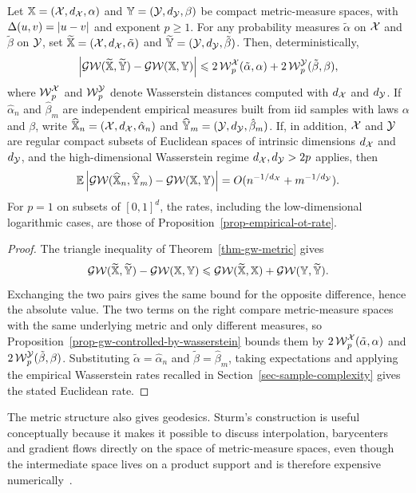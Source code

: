 \begin{prop}\label{prop-gw-empirical-stability}
	Let $\mathbb{X}=(\mathcal{X},d_{\mathcal{X}},\alpha)$ and $\mathbb{Y}=(\mathcal{Y},d_{\mathcal{Y}},\beta)$ be compact metric-measure spaces, with $\Delta(u,v)=|u-v|$ and exponent $p\geq1$. For any probability measures $\tilde\alpha$ on $\mathcal{X}$ and $\tilde\beta$ on $\mathcal{Y}$, set
	$\widetilde{\mathbb{X}}=(\mathcal{X},d_{\mathcal{X}},\tilde\alpha)$ and $\widetilde{\mathbb{Y}}=(\mathcal{Y},d_{\mathcal{Y}},\tilde\beta)$.
	Then, deterministically,
	\[
		\left\lvert\operatorname{\mathcal{GW}}(\widetilde{\mathbb{X}},\widetilde{\mathbb{Y}})-\operatorname{\mathcal{GW}}(\mathbb{X},\mathbb{Y})\right\rvert
		\leqslant
		2\operatorname{\mathcal{W}}_p^{\mathcal{X}}(\tilde\alpha,\alpha)
		+
		2\operatorname{\mathcal{W}}_p^{\mathcal{Y}}(\tilde\beta,\beta),
	\]
	where $\operatorname{\mathcal{W}}_p^{\mathcal{X}}$ and $\operatorname{\mathcal{W}}_p^{\mathcal{Y}}$ denote Wasserstein distances computed with $d_{\mathcal{X}}$ and $d_{\mathcal{Y}}$. If $\hat\alpha_n$ and $\hat\beta_m$ are independent empirical measures built from iid samples with laws $\alpha$ and $\beta$, write $\widehat{\mathbb{X}}_n=(\mathcal{X},d_{\mathcal{X}},\hat\alpha_n)$ and $\widehat{\mathbb{Y}}_m=(\mathcal{Y},d_{\mathcal{Y}},\hat\beta_m)$.
	If, in addition, $\mathcal{X}$ and $\mathcal{Y}$ are regular compact subsets of Euclidean spaces of intrinsic dimensions $d_{\mathcal{X}}$ and $d_{\mathcal{Y}}$, and the high-dimensional Wasserstein regime $d_{\mathcal{X}},d_{\mathcal{Y}}>2p$ applies, then
	\[
		\mathbb{E}\left\lvert\operatorname{\mathcal{GW}}(\widehat{\mathbb{X}}_n,\widehat{\mathbb{Y}}_m)-\operatorname{\mathcal{GW}}(\mathbb{X},\mathbb{Y})\right\rvert
		=
		O(n^{-1/d_{\mathcal{X}}}+m^{-1/d_{\mathcal{Y}}}).
	\]
	For $p=1$ on subsets of $[0,1]^d$, the rates, including the low-dimensional logarithmic cases, are those of Proposition~\ref{prop-empirical-ot-rate}.
\end{prop}

\begin{proof}
	The triangle inequality of Theorem~\ref{thm-gw-metric} gives
	\[
		\operatorname{\mathcal{GW}}(\widetilde{\mathbb{X}},\widetilde{\mathbb{Y}})
		-
		\operatorname{\mathcal{GW}}(\mathbb{X},\mathbb{Y})
		\leqslant
		\operatorname{\mathcal{GW}}(\widetilde{\mathbb{X}},\mathbb{X})
		+
		\operatorname{\mathcal{GW}}(\mathbb{Y},\widetilde{\mathbb{Y}}).
	\]
	Exchanging the two pairs gives the same bound for the opposite difference, hence the absolute value. The two terms on the right compare metric-measure spaces with the same underlying metric and only different measures, so Proposition~\ref{prop-gw-controlled-by-wasserstein} bounds them by $2\operatorname{\mathcal{W}}_p^{\mathcal{X}}(\tilde\alpha,\alpha)$ and $2\operatorname{\mathcal{W}}_p^{\mathcal{Y}}(\tilde\beta,\beta)$. Substituting $\tilde\alpha=\hat\alpha_n$ and $\tilde\beta=\hat\beta_m$, taking expectations and applying the empirical Wasserstein rates recalled in Section~\ref{sec-sample-complexity} gives the stated Euclidean rate.
\end{proof}

The metric structure also gives geodesics. Sturm's construction is useful conceptually because it makes it possible to discuss interpolation, barycenters and gradient flows directly on the space of metric-measure spaces, even though the intermediate space lives on a product support and is therefore expensive numerically~\cite{SturmGW}.

